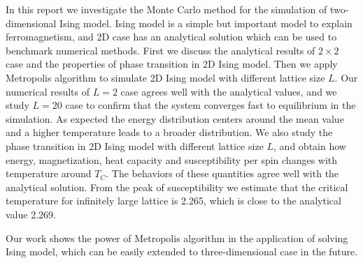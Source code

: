 In this report we investigate the Monte Carlo method for the simulation of two-dimensional Ising model. 
Ising model is a simple but important model to explain ferromagnetism, and 2D case has an analytical solution which can be used to benchmark numerical methods. 
First we discuss the analytical results of $2 \times 2$ case and the properties of phase transition in 2D Ising model. 
Then we apply Metropolis algorithm to simulate 2D Ising model with different lattice size $L$. 
Our numerical results of $L=2$ case agrees well with the analytical values, 
and we study $L=20$ case to confirm that the system converges fast to equilibrium in the simulation. 
As expected the energy distribution centers around the mean value and a higher temperature leads to a broader distribution. 
We also study the phase transition in 2D Ising model with different lattice size $L$, 
and obtain how energy, magnetization, heat capacity and susceptibility per spin changes with temperature around $T_C$. 
The behaviors of these quantities agree well with the analytical solution. 
From the peak of susceptibility we estimate that the critical temperature for infinitely large lattice is 2.265, 
which is close to the analytical value 2.269. 
\par
Our work shows the power of Metropolis algorithm in the application of solving Ising model, 
which can be easily extended to three-dimensional case in the future. 
